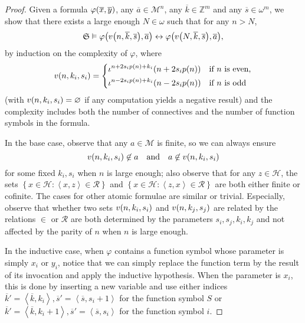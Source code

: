 \documentclass[11pt]{article}
\theoremstyle{plain}
\theoremstyle{definition}
\newcommand{\tuple}[1]{\left\langle #1 \right\rangle}
\begin{document}
\begin{proof}
  Given a formula $\varphi\mleft(\overline{x}, \overline{y}\mright)$, any $\overline{a} \in \mathcal{M}^n$, any $\overline{k} \in \mathbb{Z}^m$ and any $\overline{s} \in \omega^m$, we show that there exists a large enough $N \in \omega$ such that for any $n > N$,
  \[\mathfrak{S} \vDash \varphi\mleft(v\mleft(n, \overline{k}, \overline{s}\mright), \overline{a}\mright) \leftrightarrow \varphi\mleft(v\mleft(N, \overline{k}, \overline{s}\mright), \overline{a}\mright),\]
  by induction on the complexity of $\varphi$, where
  \[v\mleft(n, k_i, s_i\mright) = \left\{\begin{aligned}
       & \iota^{n + 2s_ip\mleft(n\mright) + k_i}\mleft(n + 2s_ip\mleft(n\mright)\mright) &  & \text{if $n$ is even}, \\
       & \iota^{n - 2s_ip\mleft(n\mright) + k_i}\mleft(n - 2s_ip\mleft(n\mright)\mright) &  & \text{if $n$ is odd}   \\
    \end{aligned}\right.\]
  (with $v\mleft(n, k_i, s_i\mright) = \varnothing$ if any computation yields a negative result) and the complexity includes both the number of connectives and the number of function symbols in the formula.

  In the base case, observe that any $a \in \mathcal{M}$ is finite, so we can always ensure
  \[v\mleft(n, k_i, s_i\mright) \not\in a \quad \text{and} \quad a \not\in v\mleft(n, k_i, s_i\mright)\]
  for some fixed $k_i, s_i$ when $n$ is large enough; also observe that for any $z \in \mathcal{H}$, the sets $\left\{x \in \mathcal{H} : \tuple{x, z} \in \mathcal{R}\right\}$ and $\left\{x \in \mathcal{H} : \tuple{z, x} \in \mathcal{R}\right\}$ are both either finite or cofinite. The cases for other atomic formulae are similar or trivial. Especially, observe that whether two sets $v\mleft(n, k_i, s_i\mright)$ and $v\mleft(n, k_j, s_j\mright)$ are related by the relations $\in$ or $\mathcal{R}$ are both determined by the parameters $s_i, s_j, k_i, k_j$ and not affected by the parity of $n$ when $n$ is large enough.

  In the inductive case, when $\varphi$ contains a function symbol whose parameter is simply $x_i$ or $y_i$, notice that we can simply replace the function term by the result of its invocation and apply the inductive hypothesis. When the parameter is $x_i$, this is done by inserting a new variable and use either indices $\overline{k}' = \tuple{\overline{k}, k_i}, \overline{s}' = \tuple{\overline{s}, s_i + 1}$ for the function symbol $S$ or $\overline{k}' = \tuple{\overline{k}, k_i + 1}, \overline{s}' = \tuple{\overline{s}, s_i}$ for the function symbol $i$.


\end{proof}
\end{document}
